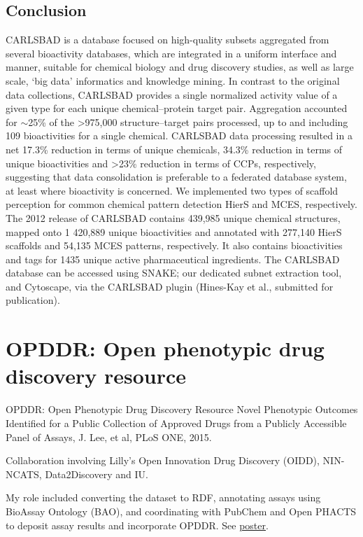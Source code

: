 \subsection{Conclusion}

CARLSBAD is a database focused on high-quality subsets aggregated from several bioactivity databases, which are integrated in a uniform interface and manner, suitable for chemical biology and drug discovery studies, as well as large scale, ‘big data’ informatics and knowledge mining. In contrast to the original data collections, CARLSBAD provides a single normalized activity value of a given type for each unique chemical–protein target pair. Aggregation accounted for $\sim$25\% of the \textgreater 975,000 structure–target pairs processed, up to and including 109 bioactivities for a single chemical. CARLSBAD data processing resulted in a net 17.3\% reduction in terms of unique chemicals, 34.3\% reduction in terms of unique bioactivities and \textgreater 23\% reduction in terms of CCPs, respectively, suggesting that data consolidation is preferable to a federated database system, at least where bioactivity is concerned. We implemented two types of scaffold perception for common chemical pattern detection HierS and MCES, respectively. The 2012 release of CARLSBAD contains 439,985 unique chemical structures, mapped onto 1 420,889 unique bioactivities and annotated with 277,140 HierS scaffolds and 54,135 MCES patterns, respectively. It also contains bioactivities and tags for 1435 unique active pharmaceutical ingredients. The CARLSBAD database can be accessed using SNAKE; our dedicated subnet extraction tool, and Cytoscape, via the CARLSBAD plugin (Hines-Kay et al., submitted for publication).




\section{OPDDR: Open phenotypic drug discovery resource}

OPDDR: Open Phenotypic Drug Discovery Resource
Novel Phenotypic Outcomes Identified for a Public Collection of Approved Drugs from a Publicly Accessible Panel of Assays, J. Lee, et al, PLoS ONE, 2015\cite{Lee2015-vg}.

Collaboration involving Lilly's Open Innovation Drug Discovery (OIDD), NIN-NCATS, Data2Discovery and IU.  

My role included converting the dataset to RDF,  annotating assays using BioAssay Ontology (BAO), and coordinating with PubChem and Open PHACTS to deposit assay results and incorporate OPDDR.
See \href{https://zenodo.org/record/4844529}{poster}.

